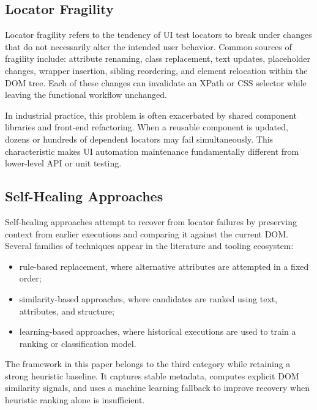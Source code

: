 \documentclass[conference]{IEEEtran}
\begin{document}
\subsection{Locator Fragility}
Locator fragility refers to the tendency of UI test locators to break under changes that do not necessarily alter the intended user behavior. Common sources of fragility include: attribute renaming, class replacement, text updates, placeholder changes, wrapper insertion, sibling reordering, and element relocation within the DOM tree. Each of these changes can invalidate an XPath or CSS selector while leaving the functional workflow unchanged.

In industrial practice, this problem is often exacerbated by shared component libraries and front-end refactoring. When a reusable component is updated, dozens or hundreds of dependent locators may fail simultaneously. This characteristic makes UI automation maintenance fundamentally different from lower-level API or unit testing.

\subsection{Self-Healing Approaches}

Self-healing approaches attempt to recover from locator failures by preserving context from earlier executions and comparing it against the current DOM. Several families of techniques appear in the literature and tooling ecosystem:
\begin{itemize}[leftmargin=1.2em]
    \item rule-based replacement, where alternative attributes are attempted in a fixed order;
    \item similarity-based approaches, where candidates are ranked using text, attributes, and structure;
    \item learning-based approaches, where historical executions are used to train a ranking or classification model.
\end{itemize}

The framework in this paper belongs to the third category while retaining a strong heuristic baseline. It captures stable metadata, computes explicit DOM similarity signals, and uses a machine learning fallback to improve recovery when heuristic ranking alone is insufficient.
\end{document}
